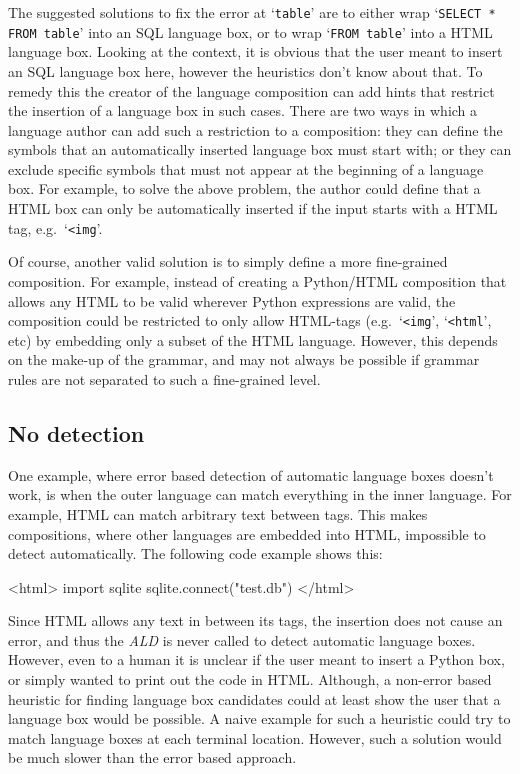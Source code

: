 \documentclass[sigplan,screen]{acmart}\settopmatter{printfolios=true,printccs=false,printacmref=false}
\newcommand{\ald}[0]{\emph{ALD}\xspace}
\newcommand{\qtt}[1]{`\texttt{#1}'\xspace}
\begin{document}
The suggested solutions to fix the error at \qtt{table} are to either wrap
\qtt{SELECT * FROM table} into an SQL language box, or to wrap
\qtt{FROM table} into a HTML language box. Looking at the context, it is obvious
that the user meant to insert an SQL language box here, however the heuristics don't
know about that. To remedy this the creator of the language composition can add hints that
restrict the insertion of a language box in such cases. There are two ways in which
a language author can add such a restriction to a composition: they can define
the symbols that an automatically inserted language box must start with;
or they can exclude specific symbols that must not appear at the beginning of a
language box. For example, to solve the above problem, the author could define
that a HTML box can only be automatically inserted if the input starts with a HTML tag,
e.g.~\qtt{<img}.

Of course, another valid solution is to simply define a more
fine-grained composition. For example, instead of creating a Python/HTML
composition that allows any HTML to be valid wherever Python expressions are
valid, the composition could be restricted to only allow HTML-tags
(e.g.~\qtt{<img}, \qtt{<html}, etc) by embedding only a subset of the HTML
language. However, this depends on the make-up of the grammar, and may not
always be possible if grammar rules are not separated to such a fine-grained
level.

\subsection{No detection}

One example, where error based detection of automatic language boxes doesn't
work, is when the outer language can match everything in the inner language.
For example, HTML can match arbitrary text between tags. This makes
compositions, where other languages are embedded into HTML, impossible to
detect automatically. The following code example shows this:

\begin{lstdefault}[language=html]
<html>
import sqlite
sqlite.connect("test.db")
</html>
\end{lstdefault}
\vspace{1em}

Since HTML allows any text in between its tags, the insertion does not cause an
error, and thus the \ald is never called to detect automatic language boxes.
However, even to a human it is unclear if the user meant to insert a Python
box, or simply wanted to print out the code in HTML. Although, a non-error
based heuristic for finding language box candidates could at least show the
user that a language box would be possible.  A naive example for such a
heuristic could try to match language boxes at each terminal location. However,
such a solution would be much slower than the error based approach.
\end{document}
